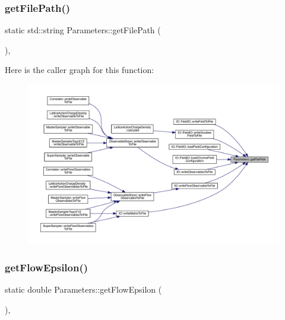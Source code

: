 \mbox{\label{class_parameters_abace4edb8ece38841b58c5ce6168cbc4}} 
\subsubsection{\texorpdfstring{getFilePath()}{getFilePath()}}
{\footnotesize\ttfamily static std\+::string Parameters\+::get\+File\+Path (\begin{DoxyParamCaption}{ }\end{DoxyParamCaption})\hspace{0.3cm}{\ttfamily [inline]}, {\ttfamily [static]}}

Here is the caller graph for this function\+:\nopagebreak
\begin{figure}[H]
\begin{center}
\leavevmode
\includegraphics[width=350pt]{class_parameters_abace4edb8ece38841b58c5ce6168cbc4_icgraph}
\end{center}
\end{figure}
\mbox{\label{class_parameters_a96dbafc27f287de83dfaec3bc2d45efe}} 
\subsubsection{\texorpdfstring{getFlowEpsilon()}{getFlowEpsilon()}}
{\footnotesize\ttfamily static double Parameters\+::get\+Flow\+Epsilon (\begin{DoxyParamCaption}{ }\end{DoxyParamCaption})\hspace{0.3cm}{\ttfamily [inline]}, {\ttfamily [static]}}

